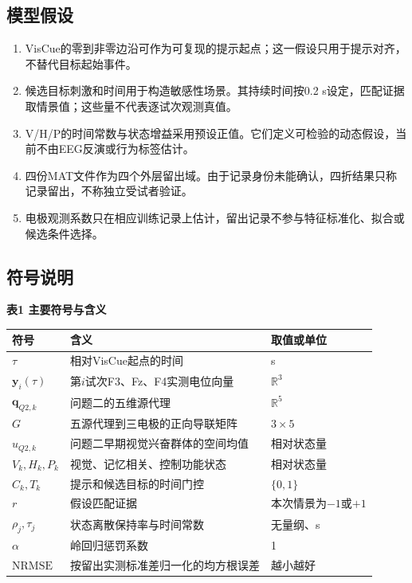 \documentclass[12pt,a4paper]{article}
\providecommand{\tightlist}{\setlength{\itemsep}{0pt}\setlength{\parskip}{0pt}}
\begin{document}
\hypertarget{ux6a21ux578bux5047ux8bbe}{%
\subsection{模型假设}\label{ux6a21ux578bux5047ux8bbe}}

\begin{enumerate}
\def\labelenumi{\arabic{enumi}.}
\tightlist
\item
  VisCue的零到非零边沿可作为可复现的提示起点；这一假设只用于提示对齐，不替代目标起始事件。
\item
  候选目标刺激和时间用于构造敏感性场景。其持续时间按0.2 s设定，匹配证据取情景值；这些量不代表逐试次观测真值。
\item
  V/H/P的时间常数与状态增益采用预设正值。它们定义可检验的动态假设，当前不由EEG反演或行为标签估计。
\item
  四份MAT文件作为四个外层留出域。由于记录身份未能确认，四折结果只称记录留出，不称独立受试者验证。
\item
  电极观测系数只在相应训练记录上估计，留出记录不参与特征标准化、拟合或候选条件选择。
\end{enumerate}

\hypertarget{ux7b26ux53f7ux8bf4ux660e}{%
\subsection{符号说明}\label{ux7b26ux53f7ux8bf4ux660e}}

\textbf{表1 主要符号与含义}

\begin{longtable}[]{@{}lll@{}}
\toprule
符号 & 含义 & 取值或单位 \\
\midrule
\endhead
\(\tau\) & 相对VisCue起点的时间 & s \\
\(\mathbf y_i(\tau)\) & 第\(i\)试次F3、Fz、F4实测电位向量 & \(\mathbb R^3\) \\
\(\mathbf q_{Q2,k}\) & 问题二的五维源代理 & \(\mathbb R^5\) \\
\(G\) & 五源代理到三电极的正向导联矩阵 & \(3\times5\) \\
\(u_{Q2,k}\) & 问题二早期视觉兴奋群体的空间均值 & 相对状态量 \\
\(V_k,H_k,P_k\) & 视觉、记忆相关、控制功能状态 & 相对状态量 \\
\(C_k,T_k\) & 提示和候选目标的时间门控 & \(\{0,1\}\) \\
\(r\) & 假设匹配证据 & 本次情景为\(-1\)或\(+1\) \\
\(\rho_j,\tau_j\) & 状态离散保持率与时间常数 & 无量纲、s \\
\(\alpha\) & 岭回归惩罚系数 & 1 \\
\(\mathrm{NRMSE}\) & 按留出实测标准差归一化的均方根误差 & 越小越好 \\
\bottomrule
\end{longtable}
\end{document}
